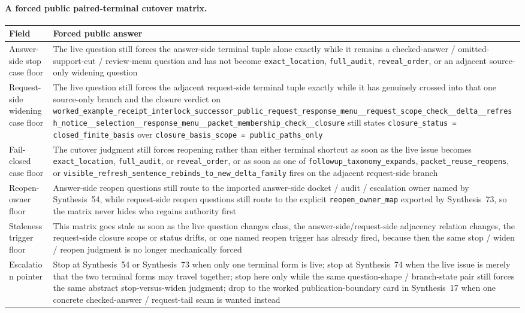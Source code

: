 \documentclass[11pt]{article}
\begin{document}
\paragraph{A forced public paired-terminal cutover matrix.}
\begin{table}[t]
\centering
\small
\begin{tabularx}{\linewidth}{@{}LY@{}}
\toprule
Field & Forced public answer \\
\midrule
Answer-side stop case floor & The live question still forces the answer-side terminal tuple alone exactly while it remains a checked-answer / omitted-support-cut / review-menu question and has not become \nolinkurl{exact_location}, \nolinkurl{full_audit}, \nolinkurl{reveal_order}, or an adjacent source-only widening question \\
Request-side widening case floor & The live question still forces the adjacent request-side terminal tuple exactly while it has genuinely crossed into that one source-only branch and the closure verdict on \nolinkurl{worked_example_receipt_interlock_successor_public_request_response_menu__request_scope_check__delta__refresh_notice__selection__response_menu__packet_membership_check__closure} still states \nolinkurl{closure_status = closed_finite_basis} over \nolinkurl{closure_basis_scope = public_paths_only} \\
Fail-closed case floor & The cutover judgment still forces reopening rather than either terminal shortcut as soon as the live issue becomes \nolinkurl{exact_location}, \nolinkurl{full_audit}, or \nolinkurl{reveal_order}, or as soon as one of \nolinkurl{followup_taxonomy_expands}, \nolinkurl{packet_reuse_reopens}, or \nolinkurl{visible_refresh_sentence_rebinds_to_new_delta_family} fires on the adjacent request-side branch \\
Reopen-owner floor & Answer-side reopen questions still route to the imported answer-side docket / audit / escalation owner named by Synthesis~54, while request-side reopen questions still route to the explicit \nolinkurl{reopen_owner_map} exported by Synthesis~73, so the matrix never hides who regains authority first \\
Staleness trigger floor & This matrix goes stale as soon as the live question changes class, the answer-side/request-side adjacency relation changes, the request-side closure scope or status drifts, or one named reopen trigger has already fired, because then the same stop / widen / reopen judgment is no longer mechanically forced \\
Escalation pointer & Stop at Synthesis~54 or Synthesis~73 when only one terminal form is live; stop at Synthesis~74 when the live issue is merely that the two terminal forms may travel together; stop here only while the same question-shape / branch-state pair still forces the same abstract stop-versus-widen judgment; drop to the worked publication-boundary card in Synthesis~17 when one concrete checked-answer / request-tail seam is wanted instead \\

\end{tabularx}
\end{table}
\end{document}
